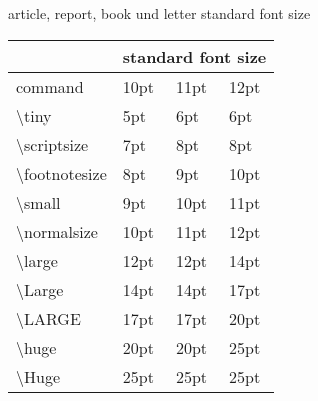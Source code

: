 
article, report, book und letter standard font size 

\begin{table}[]
    \begin{tabular}{|l|l|l|l|}
    \hline
                                    & \multicolumn{3}{l|}{standard font size} \\ \hline
    command                         &  10pt        & 11pt       & 12pt        \\ \hline
    \textbackslash{}tiny            &  5pt         & 6pt        & 6pt         \\ \hline
    \textbackslash{}scriptsize      &  7pt        &	 8pt	    & 8pt         \\ \hline
    \textbackslash{}footnotesize    &  8pt        &	 9pt	    & 10pt        \\ \hline
    \textbackslash{}small           &  9pt        &	 10pt       & 11pt        \\ \hline
    \textbackslash{}normalsize     &   10pt       &	 11pt       & 12pt        \\ \hline
    \textbackslash{}large          &   12pt       &	 12pt       & 14pt        \\ \hline
    \textbackslash{}Large          &   14pt       &	 14pt       & 17pt        \\ \hline
    \textbackslash{}LARGE    	   &   17pt       &	 17pt       & 20pt        \\ \hline
    \textbackslash{}huge           &   20pt       &	 20pt       & 25pt        \\ \hline
    \textbackslash{}Huge           &   25pt       &	 25pt       & 25pt        \\ \hline
    \end{tabular}
    \end{table}






